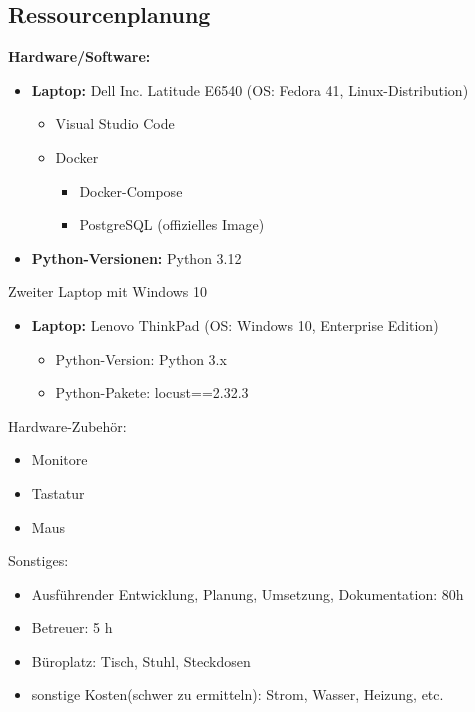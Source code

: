 \subsection{Ressourcenplanung}\label{sec:Ressourcenplanung}
\textbf{Hardware/Software:}

\begin{itemize}
    \item \textbf{Laptop:} Dell Inc. Latitude E6540 (OS: Fedora 41, Linux-Distribution)
	\begin{itemize}
        \item Visual Studio Code
        \item Docker
        \begin{itemize}
			\item Docker-Compose
            \item PostgreSQL (offizielles Image)
        \end{itemize}
    \end{itemize}
    \item \textbf{Python-Versionen:} Python 3.12
\end{itemize}

 Zweiter Laptop mit Windows 10 
    \begin{itemize}
        \item \textbf{Laptop:} Lenovo ThinkPad (OS: Windows 10, Enterprise Edition)
        \begin{itemize}
            \item Python-Version: Python 3.x
            \item Python-Pakete: locust==2.32.3
        \end{itemize}
    \end{itemize}

Hardware-Zubehör:
    \begin{itemize}
        \item Monitore  
        \item Tastatur  
        \item Maus  
    \end{itemize}
	
Sonstiges: 
\begin{itemize}
	\item Ausführender Entwicklung, Planung, Umsetzung, Dokumentation: 80h
	\item Betreuer: 5 h
	\item Büroplatz: Tisch, Stuhl, Steckdosen
	\item sonstige Kosten(schwer zu ermitteln): Strom, Wasser, Heizung, etc. 
\end{itemize}

